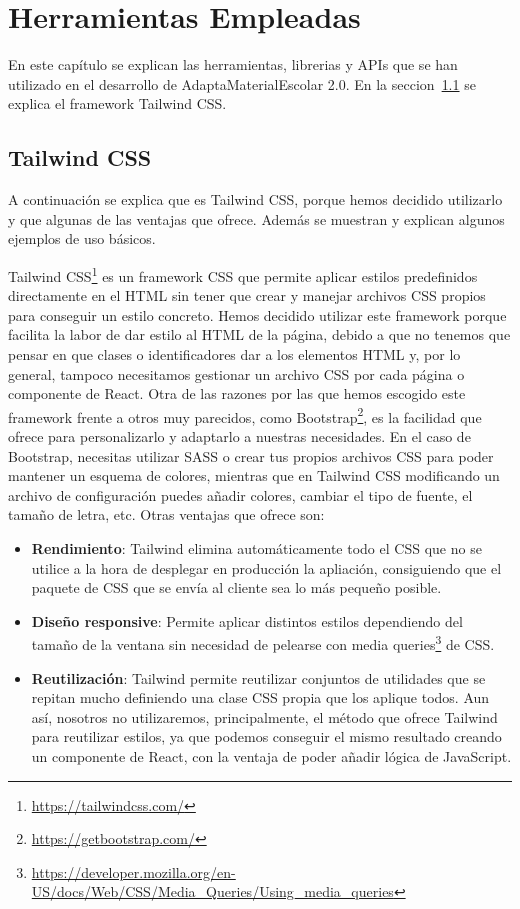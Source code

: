 \chapter{Herramientas Empleadas}\label{ch:herramientas}

En este capítulo se explican las herramientas, librerias y APIs que se han utilizado en el desarrollo de AdaptaMaterialEscolar 2.0. En la seccion~\ref{sec:tailwind} se explica el framework Tailwind CSS.

\section{Tailwind CSS}\label{sec:tailwind}
A continuación se explica que es Tailwind CSS, porque hemos decidido utilizarlo y que algunas de las ventajas que ofrece. Además se muestran y explican algunos ejemplos de uso básicos.

Tailwind CSS\footnote{\url{https://tailwindcss.com/}} es un framework CSS que permite aplicar estilos predefinidos directamente en el HTML sin tener que crear y manejar archivos CSS propios para conseguir un estilo concreto. Hemos decidido utilizar este framework porque facilita la labor de dar estilo al HTML de la página, debido a que no tenemos que pensar en que clases o identificadores dar a los elementos HTML y, por lo general, tampoco necesitamos gestionar un archivo CSS por cada página o componente de React. Otra de las razones por las que hemos escogido este framework frente a otros muy parecidos, como Bootstrap\footnote{\url{https://getbootstrap.com/}}, es la facilidad que ofrece para personalizarlo y adaptarlo a nuestras necesidades. En el caso de Bootstrap, necesitas utilizar SASS o crear tus propios archivos CSS para poder mantener un esquema de colores, mientras que en Tailwind CSS modificando un archivo de configuración puedes añadir colores, cambiar el tipo de fuente, el tamaño de letra, etc. Otras ventajas que ofrece son:
\begin{itemize}
    \item \textbf{Rendimiento}: Tailwind elimina automáticamente todo el CSS que no se utilice a la hora de desplegar en producción la apliación, consiguiendo que el paquete de CSS que se envía al cliente sea lo más pequeño posible.
    \item \textbf{Diseño responsive}: Permite aplicar distintos estilos dependiendo del tamaño de la ventana sin necesidad de pelearse con media queries\footnote{\url{https://developer.mozilla.org/en-US/docs/Web/CSS/Media_Queries/Using_media_queries}} de CSS.
    \item \textbf{Reutilización}: Tailwind permite reutilizar conjuntos de utilidades que se repitan mucho definiendo una clase CSS propia que los aplique todos. Aun así, nosotros no utilizaremos, principalmente, el método que ofrece Tailwind para reutilizar estilos, ya que podemos conseguir el mismo resultado creando un componente de React, con la ventaja de poder añadir lógica de JavaScript.
\end{itemize}

